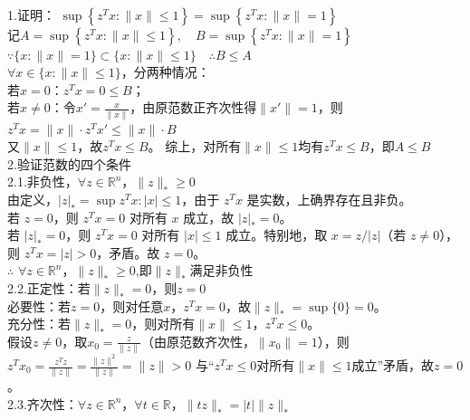 \documentclass{article}
\newenvironment{solution_cn}{%
  \begin{proof}[解答]%
  \kaishu  %
}{%
  \end{proof}%
}
\begin{document}
\begin{solution_cn} 
\quad \\1.证明： $\sup \left\{ z^T x : \|x\| \leq 1 \right\} = \sup \left \{ z^T x : \|x\| = 1 \right\}$ \\
记$A = \sup\left\{ z^T x : \|x\| \leq 1 \right\},\quad B = \sup\left\{ z^T x : \|x\| = 1 \right\}$\\
$\because \{x : \|x\| = 1 \} \subset \{x : \|x\| \leq 1\} \quad \therefore B \leq A$\\
$\forall x \in \{x : \|x\| \leq 1\}$，分两种情况：\\  若$x = 0$：$z^T x = 0 \leq B$；\\
 若$x \neq 0$：令$x' = \frac{x}{\|x\|}$，由原范数正齐次性得$\|x'\| = 1$，则
  $ z^T x = \|x\| \cdot z^T x' \leq \|x\| \cdot B$ \\
  又$\|x\| \leq 1$，故$z^T x \leq B$。
综上，对所有$\|x\| \leq 1$均有$z^T x \leq B$，即$A \leq B$\\
2.验证范数的四个条件\\
2.1.非负性，$\forall z \in \mathbb{R}^n$，$\|z\|_* \geq 0$
\\由定义，$| z |_* = \sup { z^T x : | x | \leq 1 }$，由于 $z^T x$ 是实数，上确界存在且非负。\\ 若 $z = 0$，则 $z^T x = 0$ 对所有 $x$ 成立，故 $| z |_* = 0$。 \\若 $| z |_* = 0$，则 $z^T x = 0$ 对所有 $| x | \leq 1$ 成立。特别地，取 $x = z / | z |$（若 $z \neq 0$），则 $z^T x = | z | > 0$，矛盾。故 $z = 0$。\\
$\therefore$ $\forall z \in \mathbb{R}^n$，$\|z\|_* \geq 0$,即$\|z\|_*$满足非负性\\
2.2.正定性：若$\|z\|_* = 0$，则$z = 0$\\
必要性：若$z = 0$，则对任意$x$，$z^T x = 0$，故$\|z\|_* = \sup\{0\} = 0$。\\
充分性：若$\|z\|_* = 0$，则对所有$\|x\| \leq 1$，$z^T x \leq 0$。  \\
  假设$z \neq 0$，取$x_0 = \frac{z}{\|z\|}$（由原范数齐次性，$\|x_0\| = 1$），则$
  z^T x_0 = \frac{z^T z}{\|z\|} = \frac{\|z\|^2}{\|z\|} = \|z\| > 0 $
  与“$z^T x \leq 0$对所有$\|x\| \leq 1$成立”矛盾，故$z = 0$。\\
2.3.齐次性：$\forall z \in \mathbb{R}^n$，$\forall t \in \mathbb{R}$，$\|tz\|_* = |t| \|z\|_*$
\end{solution_cn}
\end{document}
